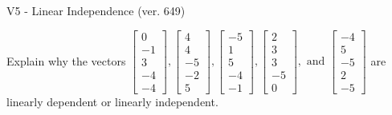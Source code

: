 \begin{exercise}
  \begin{exerciseTitle}V5 - Linear Independence (ver. 649)\end{exerciseTitle}
  \begin{exerciseStatement}
    Explain why the vectors \(\left[\begin{array}{r}
0 \\
-1 \\
3 \\
-4 \\
-4
\end{array}\right] , \left[\begin{array}{r}
4 \\
4 \\
-5 \\
-2 \\
5
\end{array}\right] , \left[\begin{array}{r}
-5 \\
1 \\
5 \\
-4 \\
-1
\end{array}\right] , \left[\begin{array}{r}
2 \\
3 \\
3 \\
-5 \\
0
\end{array}\right] , \text{ and } \left[\begin{array}{r}
-4 \\
5 \\
-5 \\
2 \\
-5
\end{array}\right]\) are linearly dependent or linearly independent.	



\end{exerciseStatement}
\end{exercise}
